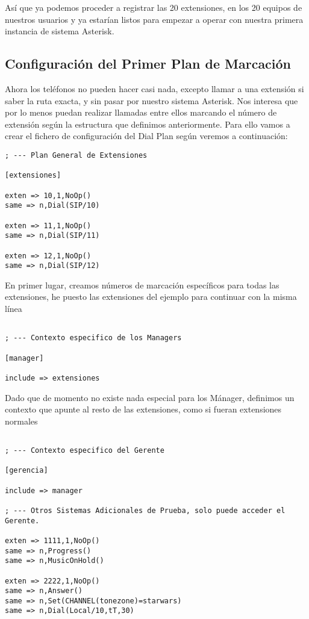 Así que ya podemos proceder a registrar las 20 extensiones, en los 20 equipos de nuestros usuarios y ya estarían listos para empezar a operar con nuestra primera instancia de sistema Asterisk.

\newpage

\subsection{Configuración del Primer Plan de Marcación}

Ahora los teléfonos no pueden hacer casi nada, excepto llamar a una extensión si saber la ruta exacta, y sin pasar por nuestro sistema Asterisk. Nos interesa que por lo menos puedan realizar llamadas entre ellos marcando el número de extensión según la estructura que definimos anteriormente. Para ello vamos a crear el fichero de configuración del Dial Plan según veremos a continuación:

\begin{lstlisting}[style=bash,title={/etc/asterisk/extensions.conf}]
; --- Plan General de Extensiones

[extensiones]

exten => 10,1,NoOp()
same => n,Dial(SIP/10)

exten => 11,1,NoOp()
same => n,Dial(SIP/11)

exten => 12,1,NoOp()
same => n,Dial(SIP/12)

\end{lstlisting}

En primer lugar, creamos números de marcación específicos para todas las extensiones, he puesto las extensiones del ejemplo para continuar con la misma línea

\begin{lstlisting}[style=bash,title={/etc/asterisk/extensions.conf}]

; --- Contexto especifico de los Managers

[manager]

include => extensiones

\end{lstlisting}

Dado que de momento no existe nada especial para los Mánager, definimos un contexto que apunte al resto de las extensiones, como si fueran extensiones normales

\begin{lstlisting}[style=bash,title={/etc/asterisk/extensions.conf}]

; --- Contexto especifico del Gerente

[gerencia]

include => manager

; --- Otros Sistemas Adicionales de Prueba, solo puede acceder el Gerente.

exten => 1111,1,NoOp()
same => n,Progress()
same => n,MusicOnHold()

exten => 2222,1,NoOp()
same => n,Answer()
same => n,Set(CHANNEL(tonezone)=starwars)
same => n,Dial(Local/10,tT,30)

\end{lstlisting}

